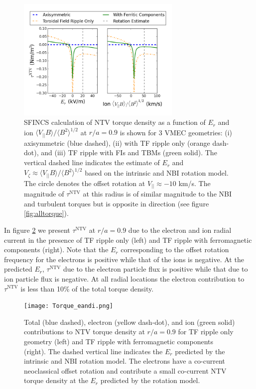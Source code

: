 \documentclass[aip, pop, preprint]{revtex4-1}
\numberwithin{figure}{section}
\numberwithin{equation}{section}
\begin{document}
\FloatBarrier

\begin{figure}[h!]
\centering
\includegraphics[width=0.7\textwidth]{Torque_ErandV.png}
\caption{\label{fig:Torque_ErandV} SFINCS calculation of NTV torque density as a function of $E_r$ and ion $\langle V_{||} B \rangle/\langle B^2 \rangle^{1/2}$ at $r/a = 0.9$ is shown for 3 VMEC geometries: (i) axisymmetric (blue dashed), (ii) with TF ripple only (orange dash-dot), and (iii) TF ripple with FIs and TBMs (green solid). The vertical dashed line indicates the estimate of $E_r$ and $V_{\zeta} \approx \langle V_{||} B \rangle/\langle B^2 \rangle^{1/2}$ based on the intrinsic and NBI rotation model. The circle denotes the offset rotation at $V_{||} \approx -10$ km/s. The magnitude of $\tau^{\text{NTV}}$ at this radius is of similar magnitude to the NBI and turbulent torques but is opposite in direction (see figure \ref{fig:alltorque}).}
\end{figure}

In figure \ref{fig:Torque_eandi} we present $\tau^{\text{NTV}}$ at $r/a = 0.9$ due to the electron and ion radial current in the presence of TF ripple only (left) and TF ripple with ferromagnetic components (right). Note that the $E_r$ corresponding to the offset rotation frequency for the electrons is positive while that of the ions is negative. At the predicted $E_r$, $\tau^{\text{NTV}}$ due to the electron particle flux is positive while that due to ion particle flux is negative. At all radial locations the electron contribution to $\tau^{\text{NTV}}$ is less than 10\% of the total torque density. 

\begin{figure}[h!]
\centering
\texttt{[image: Torque\_eandi.png]}
\caption{\label{fig:Torque_eandi} Total (blue dashed), electron (yellow dash-dot), and ion (green solid) contributions to NTV torque density at $r/a = 0.9$ for TF ripple only geometry (left) and TF ripple with ferromagnetic components (right). The dashed vertical line indicates the $E_r$ predicted by the intrinsic and NBI rotation model. The electrons have a co-current neoclassical offset rotation and contribute a small co-current NTV torque density at the $E_r$ predicted by the rotation model.}
\end{figure}
\end{document}
